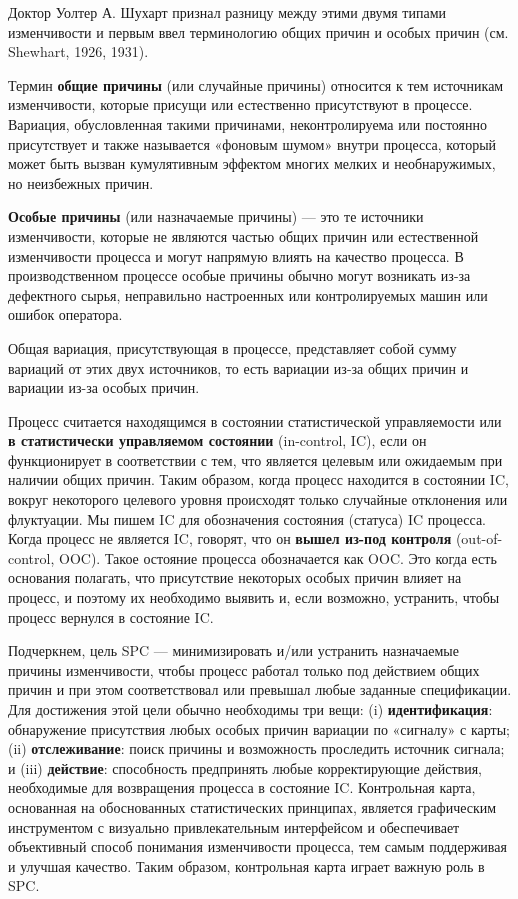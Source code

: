 Доктор Уолтер А. Шухарт признал разницу между этими двумя типами изменчивости и первым ввел терминологию общих причин и особых причин (см. Shewhart, 1926, 1931).

Термин \textbf{общие причины} (или случайные причины) относится к тем источникам изменчивости, которые присущи или естественно присутствуют в процессе. Вариация, обусловленная такими причинами, неконтролируема или постоянно присутствует и также называется «фоновым шумом» внутри процесса, который может быть вызван кумулятивным эффектом многих мелких и необнаружимых, но неизбежных причин.

\textbf{Особые причины} (или назначаемые причины) — это те источники изменчивости, которые не являются частью общих причин или естественной изменчивости процесса и могут напрямую влиять на качество процесса. В производственном процессе особые причины обычно могут возникать из-за дефектного сырья, неправильно настроенных или контролируемых машин или ошибок оператора.

Общая вариация, присутствующая в процессе, представляет собой сумму вариаций от этих двух источников, то есть вариации из-за общих причин и вариации из-за особых причин.

Процесс считается находящимся в состоянии статистической управляемости или \textbf{в статистически управляемом состоянии} (in-control, IC), если он функционирует в соответствии с тем, что является целевым или ожидаемым при наличии общих причин. Таким образом, когда процесс находится в состоянии IC, вокруг некоторого целевого уровня происходят только случайные отклонения или флуктуации. Мы пишем IC для обозначения состояния (статуса) IC процесса. Когда процесс не является IC, говорят, что он \textbf{вышел из-под контроля} (out-of-control, OOC). Такое остояние процесса обозначается как OOC. Это когда есть основания полагать, что присутствие некоторых особых причин влияет на процесс, и поэтому их необходимо выявить и, если возможно, устранить, чтобы процесс вернулся в состояние IC.

Подчеркнем, цель SPC — минимизировать и/или устранить назначаемые причины изменчивости, чтобы процесс работал только под действием общих причин и при этом соответствовал или превышал любые заданные спецификации. Для достижения этой цели обычно необходимы три вещи: (i) \textbf{идентификация}: обнаружение присутствия любых особых причин вариации по «сигналу» с карты; (ii) \textbf{отслеживание}: поиск причины и возможность проследить источник сигнала; и (iii) \textbf{действие}: способность предпринять любые корректирующие действия, необходимые для возвращения процесса в состояние IC. Контрольная карта, основанная на обоснованных статистических принципах, является графическим инструментом с визуально привлекательным интерфейсом и обеспечивает объективный способ понимания изменчивости процесса, тем самым поддерживая и улучшая качество. Таким образом, контрольная карта играет важную роль в SPC.

